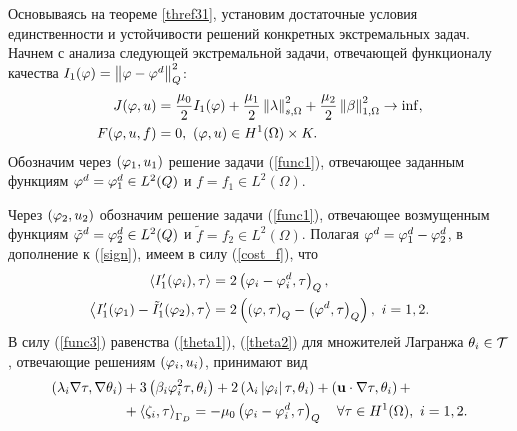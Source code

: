 Основываясь на теореме \ref{thref31}, установим достаточные условия единственности и устойчивости решений конкретных экстремальных задач. Начнем с анализа следующей экстремальной задачи, отвечающей функционалу качества $I_1 (\varphi) = \left\Vert \varphi - \varphi^d \right\Vert^2_Q$:
\begin{equation}
	\label{func1}
	\begin{split}
		J(\varphi, u) &= \frac{\mu_0}{2} I_1 (\varphi) 
		+ \frac{\mu_1}{2} \left\Vert \lambda \right\Vert^2_{s,\Omega} 
		+ \frac{\mu_2}{2} \left\Vert \beta \right\Vert^2_{1,\Omega} \to \inf, \\
		F(\varphi, u, f) &= 0, ~ \left( \varphi, u \right) \in H^1 (\Omega) \times K.
	\end{split}
\end{equation} 
Обозначим через $\left( \varphi_1, u_1 \right)$ решение задачи (\ref{func1}), отвечающее заданным функциям $\varphi^d= \varphi^d_1 \in L^2(Q)$ и $f = f_1 \in L^2 (\Omega)$. 

Через $\left( \varphi_2, u_2 \right)$ обозначим решение задачи (\ref{func1}), отвечающее возмущенным функциям $\tilde {\varphi}^d = \varphi^d_2 \in L^2(Q)$ и $\tilde f = f_2 \in L^2 (\Omega)$. Полагая $\varphi^d = \varphi^d_1 - \varphi^d_2$, в дополнение к (\ref{sign}), имеем в силу (\ref{cost_f}), что
\begin{equation}
	\label{func3}
	\begin{split}
		\left\langle I_1' (\varphi_i), \tau \right\rangle &= 2 \left( \varphi_i - \varphi^{d}_i, \tau \right)_Q, \\
		\left\langle I_1' (\varphi_1) - \tilde I_1' (\varphi_2), \tau \right\rangle &= 2 \left(  \left( \varphi, \tau \right)_Q - \left( \varphi^d, \tau \right)_Q  \right), ~ i=1, 2.  
	\end{split}
\end{equation}
В силу (\ref{func3}) равенства (\ref{theta1}), (\ref{theta2})  для множителей Лагранжа $\theta_i \in {\mathcal{T}}$, отвечающие решениям $(\varphi_i, u_i)$,  принимают вид
\begin{equation}
	\label{theta3}
	\begin{split}
		\left( \lambda_i \nabla \tau, \nabla \theta_i \right) 
		&+ 3 \left( \beta_i \varphi^2_i \tau, \theta_i \right) 
		+ 2 \left( \lambda_i \left\vert \varphi_i \right\vert \tau, \theta_i \right) 
		+ \left( \mathbf{u} \cdot \nabla \tau, \theta_i \right) + \\
		&+ \left\langle \zeta_i, \tau \right\rangle_{\Gamma_D} =
		- \mu_0 \left( \varphi_i - \varphi^d_i, \tau \right)_Q \quad 
		\forall \tau \in H^1 (\Omega), ~ i=1, 2.
	\end{split}
\end{equation}

